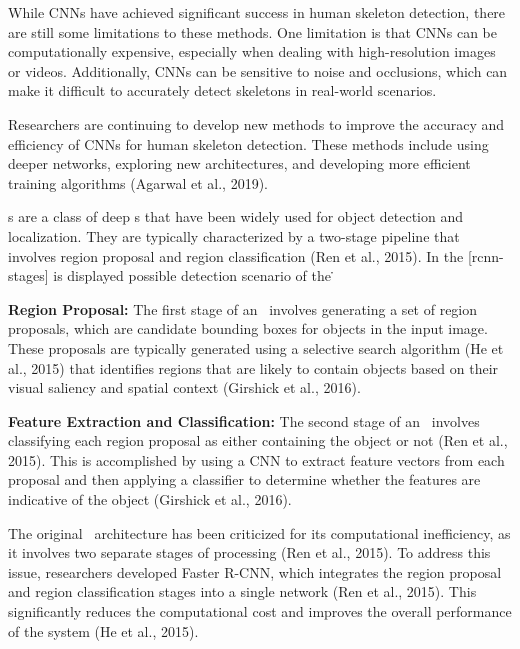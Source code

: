 
While CNNs have achieved significant success in human skeleton detection, there are still some limitations to these methods. One limitation is that CNNs can be computationally expensive, especially when dealing with high-resolution images or videos. Additionally, CNNs can be sensitive to noise and occlusions, which can make it difficult to accurately detect skeletons in real-world scenarios.

Researchers are continuing to develop new methods to improve the accuracy and efficiency of CNNs for human skeleton detection. These methods include using deeper networks, exploring new architectures, and developing more efficient training algorithms (\scc Agarwal et al., 2019).

\RCNN\-s are a class of deep \CNN\-s that have been widely used for object detection and localization. They are typically characterized by a two-stage pipeline that involves region proposal and region classification (\scc Ren et al., 2015). In the [rcnn-stages] is displayed possible detection scenario of the \RCNN\.

\startitemize[1]
    \item {\bf Region Proposal:} The first stage of an \RCNN\ involves generating a set of region proposals, which are candidate bounding boxes for objects in the input image. These proposals are typically generated using a selective search algorithm (\scc He et al., 2015) that identifies regions that are likely to contain objects based on their visual saliency and spatial context (\scc Girshick et al., 2016).
    \item {\bf Feature Extraction and Classification:} The second stage of an \RCNN\ involves classifying each region proposal as either containing the object or not (\scc Ren et al., 2015). This is accomplished by using a CNN to extract feature vectors from each proposal and then applying a classifier to determine whether the features are indicative of the object (\scc Girshick et al., 2016).
\stopitemize

The original \RCNN\ architecture has been criticized for its computational inefficiency, as it involves two separate stages of processing (\scc Ren et al., 2015). To address this issue, researchers developed Faster R-CNN, which integrates the region proposal and region classification stages into a single network (\scc Ren et al., 2015). This significantly reduces the computational cost and improves the overall performance of the system (\scc He et al., 2015).

